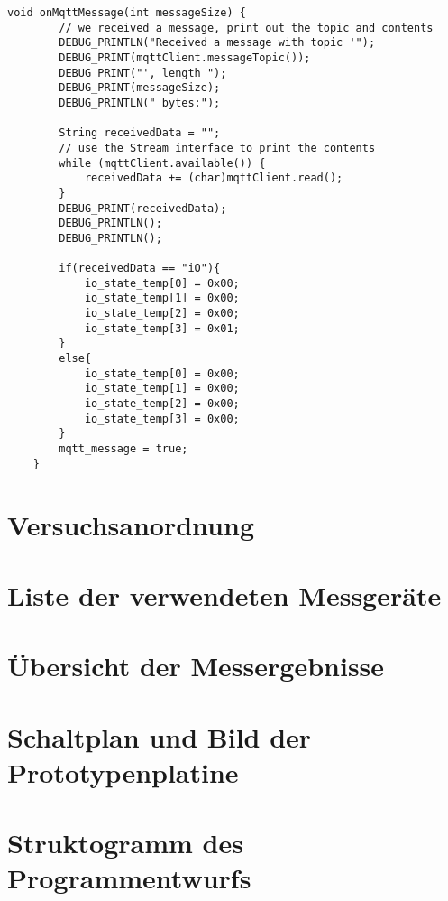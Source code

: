 \begin{lstlisting}[caption = MQTT-receive-Funktion vom MCU an der Werkerassistenzstation. ,label=lst:assembling_mqtt_receive]
	void onMqttMessage(int messageSize) {
		// we received a message, print out the topic and contents
		DEBUG_PRINTLN("Received a message with topic '");
		DEBUG_PRINT(mqttClient.messageTopic());
		DEBUG_PRINT("', length ");
		DEBUG_PRINT(messageSize);
		DEBUG_PRINTLN(" bytes:");
		
		String receivedData = "";
		// use the Stream interface to print the contents
		while (mqttClient.available()) {
			receivedData += (char)mqttClient.read();
		}
		DEBUG_PRINT(receivedData);
		DEBUG_PRINTLN();
		DEBUG_PRINTLN();
		
		if(receivedData == "iO"){
			io_state_temp[0] = 0x00;
			io_state_temp[1] = 0x00;
			io_state_temp[2] = 0x00;
			io_state_temp[3] = 0x01;
		}
		else{
			io_state_temp[0] = 0x00;
			io_state_temp[1] = 0x00;
			io_state_temp[2] = 0x00;
			io_state_temp[3] = 0x00;
		}
		mqtt_message = true;
	}
\end{lstlisting}


\setcounter{chapter}{3}
\setcounter{section}{0}
\setcounter{table}{0}
\setcounter{figure}{0}

\section{Versuchsanordnung}

\section{Liste der verwendeten Messgeräte}

\section{Übersicht der Messergebnisse}

\section{Schaltplan und Bild der Prototypenplatine}

\setcounter{chapter}{4}
\setcounter{section}{0}
\setcounter{table}{0}
\setcounter{figure}{0}

\section{Struktogramm des Programmentwurfs}

